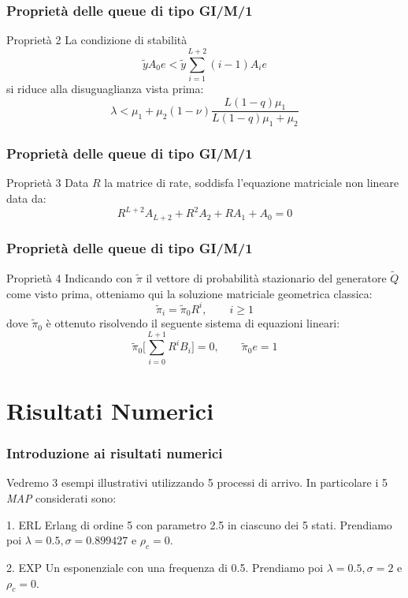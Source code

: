 \documentclass{beamer}
\begin{document}
\begin{frame}
    \frametitle{Proprietà delle queue di tipo GI/M/1}
    \begin{block}{Proprietà 2}
        La condizione di stabilità
        $$ \widetilde{y} A_0 e < \widetilde{y} \sum_{i=1}^{L+2}(i-1)A_i e $$
        si riduce alla disuguaglianza vista prima:
        $$ \lambda < \mu_1 + \mu_2(1 - \nu) \frac{L(1-q)\mu_1}{L(1-q)\mu_1 + \mu_2}  $$
    \end{block}
\end{frame}


\begin{frame}
    \frametitle{Proprietà delle queue di tipo GI/M/1}
    \begin{block}{Proprietà 3}
        Data $R$ la matrice di rate, soddisfa l'equazione matriciale non lineare data da:
        $$ R^{L+2} A_{L+2} + R^2A_2 + RA_1 + A_0 = 0 $$
    \end{block}
\end{frame}


\begin{frame}
    \frametitle{Proprietà delle queue di tipo GI/M/1}
    \begin{block}{Proprietà 4}
        Indicando con $\widetilde{\pi}$ il vettore di probabilità stazionario del generatore $\widetilde{Q}$ come visto prima, otteniamo qui la soluzione matriciale geometrica classica:
        $$ \widetilde{\pi}_i = \widetilde{\pi}_0R^i, \qquad i \geq 1 $$
        dove $\widetilde{\pi}_0$ è ottenuto risolvendo il seguente sistema di equazioni lineari:
        $$ \widetilde{\pi}_0\Bigg[ \sum_{i=0}^{L+1} R^iB_i \Bigg] = 0, \qquad \widetilde{\pi}_0e = 1 $$
    \end{block}
\end{frame}


\section{Risultati Numerici}
\begin{frame}
    \frametitle{Introduzione ai risultati numerici}
    Vedremo 3 esempi illustrativi utilizzando 5 processi di arrivo. In particolare i 5 \emph{MAP} considerati sono:
    \begin{block}{1. ERL}
        Erlang di ordine 5 con parametro 2.5 in ciascuno dei 5 stati. Prendiamo poi $\lambda = 0.5, \sigma = 0.899427$ e $\rho_c = 0$.
    \end{block}
    \begin{block}{2. EXP}
        Un esponenziale con una frequenza di 0.5. Prendiamo poi $\lambda = 0.5, \sigma = 2$ e $\rho_c = 0$.
    \end{block}
\end{frame}
\end{document}
